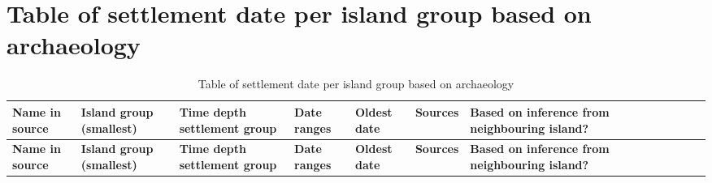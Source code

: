 \documentclass[draft,10pt]{article} %
\begin{document}
\section{Table of settlement date per island group based on archaeology}
\singlespacing
\label{dates_table_appendic}
\begin{landscape}
\begin{longtable}{| p{3cm}| p{4cm}| p{4cm}|p{2cm}|p{2cm}|p{2cm}|p{2cm}|p{2cm}|p{2cm}|p{2cm}|p{2cm}|p{2cm}|p{2cm}|p{2cm}}

\caption{{Table of settlement date per island group based on archaeology}} \label{dates_pol_complex_table}\\
\hline
\textbf{ Name in source } & \textbf{Island group (smallest) } & \textbf{ Time depth settlement group } & \textbf{ Date ranges } & \textbf{ Oldest date } & \textbf{ Sources} & \textbf{ Based on inference from neighbouring island? } \\ \hline
\endfirsthead

\hline
\textbf{ Name in source } & \textbf{ ﻿Island group (smallest) } & \textbf{ Time depth settlement group } & \textbf{ Date ranges } & \textbf{ Oldest date } & \textbf{ Sources} & \textbf{ Based on inference from neighbouring island? } \\ \hline
\endhead


\end{longtable}
\end{landscape}
\end{document}
